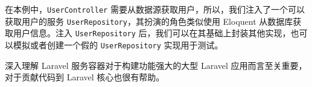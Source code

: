 \documentclass{progartcn}
\begin{document}
在本例中，\texttt{UserController} 需要从数据源获取用户，所以，我们注入了一个可以获取用户的服务 \texttt{UserRepository}，其扮演的角色类似使用 Eloquent 从数据库获取用户信息。注入 \texttt{UserRepository} 后，我们可以在其基础上封装其他实现，也可以模拟或者创建一个假的 \texttt{UserRepository} 实现用于测试。

深入理解 Laravel 服务容器对于构建功能强大的大型 Laravel 应用而言至关重要，对于贡献代码到 Laravel 核心也很有帮助。

\end{document}
